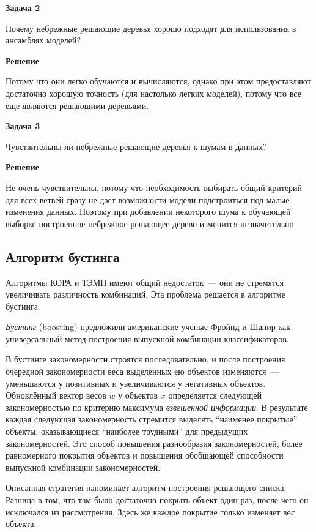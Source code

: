 \textbf{Задача 2}

Почему небрежные решающие деревья хорошо подходят для использования в ансамблях моделей?

\textbf{Решение}

Потому что они легко обучаются и вычисляются,
однако при этом предоставляют достаточно хорошую точность (для настолько легких моделей), потому что все еще являются
решающими деревьями.

\textbf{Задача 3}

Чувствительны ли небрежные решающие деревья к шумам в данных?

\textbf{Решение}

Не очень чувствительны, потому что необходимость выбирать общий критерий для всех ветвей сразу не дает возможности
модели подстроиться под малые изменения данных. Поэтому при добавлении некоторого шума к обучающей выборке построенное
небрежное решающее дерево изменится незначительно.

\subsection*{Алгоритм бустинга}

Алгоритмы КОРА и ТЭМП имеют общий недостаток~--- они не стремятся увеличивать различность комбинаций. Эта проблема решается в алгоритме бустинга.

\textit{Бустинг} (boosting) предложили американские учёные Фройнд и Шапир как универсальный метод построения выпускной комбинации классификаторов. 

В бустинге закономерности строятся последовательно, и после построения очередной закономерности веса выделенных ею объектов изменяются~--- уменьшаются у позитивных и увеличиваются у негативных объектов. Обновлённый вектор весов $w$ у объектов $x$ определяется следующей закономерностью по критерию максимума \textit{взвешенной информации}. В результате каждая следующая закономерность стремится выделять ``наименее покрытые'' объекты, оказывающиеся ``наиболее трудными'' для предыдущих закономерностей. Это способ повышения разнообразия закономерностей, более равномерного покрытия объектов и повышения обобщающей способности выпускной комбинации закономерностей.

Описанная стратегия напоминает алгоритм построения решающего списка. Разница в том, что там было достаточно покрыть объект один раз, после чего он исключался из рассмотрения. Здесь же каждое покрытие только изменяет вес объекта.

